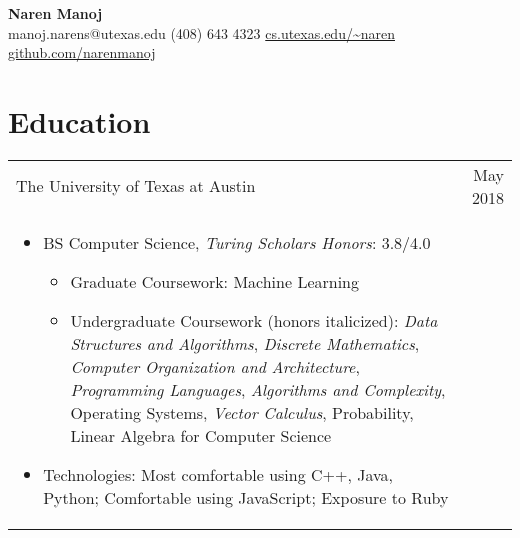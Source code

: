 \documentclass[9pt]{extarticle}
\begin{document}
\begin{center}
\huge \textbf{Naren Manoj} \\
\vspace{2mm}
\normalsize manoj.narens@utexas.edu \hspace{1mm}
\textbullet \hspace{1mm} (408) 643 4323 \hspace{1mm} \textbullet \hspace{1mm} \url{cs.utexas.edu/~naren} \hspace{1mm} \textbullet \hspace{1mm} \url{github.com/narenmanoj}
\end{center}

\normalsize

\section*{Education}

\begin{tabularx}{\textwidth}{X r }
    The University of Texas at Austin & May 2018 \\
    \vspace{-2mm}
    \begin{itemize}[noitemsep,topsep=0pt]
        \item BS Computer Science, \emph{Turing Scholars Honors}: 3.8/4.0
        \begin{itemize}
            \item Graduate Coursework: Machine Learning
            \item Undergraduate Coursework (honors italicized): \emph{Data Structures and Algorithms}, \emph{Discrete Mathematics},
                    \emph{Computer Organization and Architecture}, \emph{Programming Languages}, \emph{Algorithms and Complexity},
                    Operating Systems, \emph{Vector Calculus}, Probability, Linear Algebra for Computer Science
        \end{itemize}
        \item Technologies: Most comfortable using C++, Java, Python; Comfortable using JavaScript; Exposure to Ruby
    \end{itemize} & \\
\end{tabularx}
\end{document}
